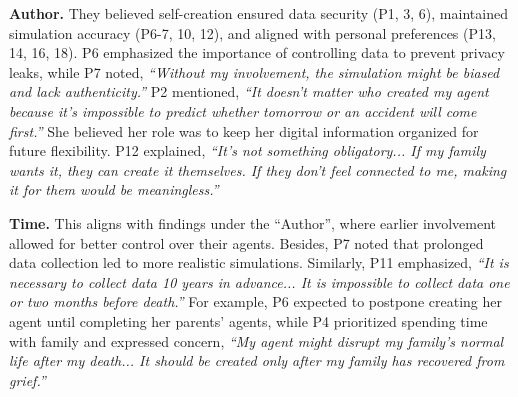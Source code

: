 \textbf{Author.} \label{author}
 They believed self-creation ensured data security (P1, 3, 6), maintained simulation accuracy (P6-7, 10, 12), and aligned with personal preferences (P13, 14, 16, 18). P6 emphasized the importance of controlling data to prevent privacy leaks, while P7 noted, \textit{``Without my involvement, the simulation might be biased and lack authenticity.''}
P2 mentioned, \textit{``It doesn't matter who created my agent because it's impossible to predict whether tomorrow or an accident will come first.''} She believed her role was to keep her digital information organized for future flexibility.
 P12 explained, \textit{``It's not something obligatory... If my family wants it, they can create it themselves. If they don't feel connected to me, making it for them would be meaningless.''}

\textbf{Time.}
This aligns with findings under the ``Author'', where earlier involvement allowed for better control over their agents. 
Besides, P7 noted that prolonged data collection led to more realistic simulations. Similarly, P11 emphasized, \textit{``It is necessary to collect data 10 years in advance... It is impossible to collect data one or two months before death.''} 
For example, P6 expected to postpone creating her agent until completing her parents' agents, while P4 prioritized spending time with family and expressed concern, \textit{``My agent might disrupt my family's normal life after my death... It should be created only after my family has recovered from grief.''}

